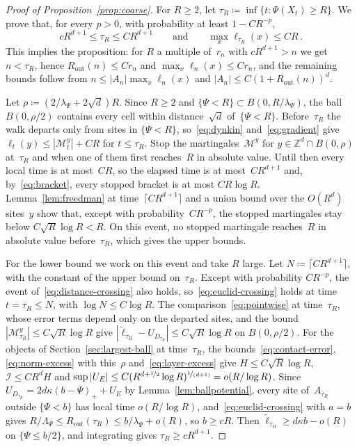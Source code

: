 \documentclass[11pt]{amsart}
\theoremstyle{plain}
\theoremstyle{definition}
\newcommand{\Z}{\mathbb Z}
\newcommand{\drift}{\kappa}
\newcommand{\gauge}{\Psi}
\newcommand{\nf}{\nicefrac}
\newcommand{\Rout}{R_{\mathrm{out}}}
\numberwithin{equation}{section}
\begin{document}
\begin{proof}[Proof of Proposition~\ref{prop:coarse}]
For $R\geq2$, let $\tau_R\coloneqq\inf\{t:\gauge(X_t)\geq R\}$. We prove that, for every $p>0$, with probability at least $1-CR^{-p}$,
\begin{equation*}
cR^{d+1}\leq\tau_R\leq CR^{d+1}
\qquad\text{and}\qquad
\max_x\ell_{\tau_R}(x)\leq CR\, .
\end{equation*}
This implies the proposition: for $R$ a multiple of~$r_n$ with $cR^{d+1}>n$ we get $n<\tau_R$, hence $\Rout(n)\leq Cr_n$ and $\max_x\ell_n(x)\leq Cr_n$, and the remaining bounds follow from $n\leq|A_n|\max_x\ell_n(x)$ and $|A_n|\leq C(1+\Rout(n))^d$.

Let $\rho\coloneqq(2/\lambda_\gauge+2\sqrt d)R$. Since $R\geq2$ and $\{\gauge<R\}\subset B(0,R/\lambda_\gauge)$, the ball $B(0,\rho/2)$ contains every cell within distance~$\sqrt d$ of~$\{\gauge<R\}$. Before~$\tau_R$ the walk departs only from sites in $\{\gauge<R\}$, so~\eqref{eq:dynkin} and~\eqref{eq:gradient} give $\ell_t(y)\leq|\mathcal M^y_t|+CR$ for $t\leq\tau_R$. Stop the martingales~$\mathcal M^y$ for $y\in\Z^d\cap B(0,\rho)$ at~$\tau_R$ and when one of them first reaches~$R$ in absolute value. Until then every local time is at most~$CR$, so the elapsed time is at most~$CR^{d+1}$ and, by~\eqref{eq:bracket}, every stopped bracket is at most $CR\log R$. Lemma~\ref{lem:freedman} at time~$\lceil CR^{d+1}\rceil$ and a union bound over the $O(R^d)$ sites~$y$ show that, except with probability~$CR^{-p}$, the stopped martingales stay below $C\sqrt R\log R<R$. On this event, no stopped martingale reaches~$R$ in absolute value before~$\tau_R$, which gives the upper bounds.

For the lower bound we work on this event and take $R$ large. Let $N\coloneqq\lceil CR^{d+1}\rceil$, with the constant of the upper bound on~$\tau_R$. Except with probability $CR^{-p}$, the event of~\eqref{eq:distance-crossing} also holds, so~\eqref{eq:euclid-crossing} holds at time $t=\tau_R\leq N$, with $\log N\leq C\log R$. The comparison~\eqref{eq:pointwise} at time~$\tau_R$, whose error terms depend only on the departed sites, and the bound $|\mathcal M^y_{\tau_R}|\leq C\sqrt R\log R$ give $|\widetilde\ell_{\tau_R}-U_{D_{\tau_R}}|\leq C\sqrt R\log R$ on $B(0,\rho/2)$. For the objects of Section~\ref{sec:largest-ball} at time~$\tau_R$, the bounds~\eqref{eq:contact-error}, \eqref{eq:norm-excess} with this~$\rho$ and~\eqref{eq:layer-excess} give $H\leq C\sqrt R\log R$, $\mathcal I\leq CR^dH$ and $\sup|U_E|\leq C(R^{d+\nf12}\log R)^{\nf{1}{(d+1)}}=o(R/\log R)$. Since $U_{D_{\tau_R}}=2d\drift(b-\gauge)_++U_E$ by Lemma~\ref{lem:ballpotential}, every site of~$A_{\tau_R}$ outside $\{\gauge<b\}$ has local time $o(R/\log R)$, and~\eqref{eq:euclid-crossing} with $a=b$ gives $R/\Lambda_\gauge\leq\Rout(\tau_R)\leq b/\lambda_\gauge+o(R)$, so $b\geq cR$. Then $\widetilde\ell_{\tau_R}\geq d\drift b-o(R)$ on $\{\gauge\leq b/2\}$, and integrating gives $\tau_R\geq cR^{d+1}$.
\end{proof}
\end{document}

